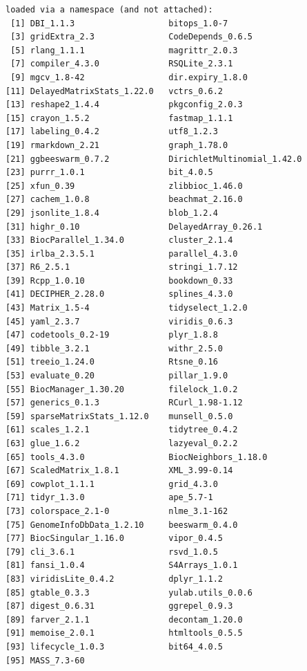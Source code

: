 \documentclass[
]{book}
\begin{document}
\begin{verbatim}
loaded via a namespace (and not attached):
 [1] DBI_1.1.3                   bitops_1.0-7               
 [3] gridExtra_2.3               CodeDepends_0.6.5          
 [5] rlang_1.1.1                 magrittr_2.0.3             
 [7] compiler_4.3.0              RSQLite_2.3.1              
 [9] mgcv_1.8-42                 dir.expiry_1.8.0           
[11] DelayedMatrixStats_1.22.0   vctrs_0.6.2                
[13] reshape2_1.4.4              pkgconfig_2.0.3            
[15] crayon_1.5.2                fastmap_1.1.1              
[17] labeling_0.4.2              utf8_1.2.3                 
[19] rmarkdown_2.21              graph_1.78.0               
[21] ggbeeswarm_0.7.2            DirichletMultinomial_1.42.0
[23] purrr_1.0.1                 bit_4.0.5                  
[25] xfun_0.39                   zlibbioc_1.46.0            
[27] cachem_1.0.8                beachmat_2.16.0            
[29] jsonlite_1.8.4              blob_1.2.4                 
[31] highr_0.10                  DelayedArray_0.26.1        
[33] BiocParallel_1.34.0         cluster_2.1.4              
[35] irlba_2.3.5.1               parallel_4.3.0             
[37] R6_2.5.1                    stringi_1.7.12             
[39] Rcpp_1.0.10                 bookdown_0.33              
[41] DECIPHER_2.28.0             splines_4.3.0              
[43] Matrix_1.5-4                tidyselect_1.2.0           
[45] yaml_2.3.7                  viridis_0.6.3              
[47] codetools_0.2-19            plyr_1.8.8                 
[49] tibble_3.2.1                withr_2.5.0                
[51] treeio_1.24.0               Rtsne_0.16                 
[53] evaluate_0.20               pillar_1.9.0               
[55] BiocManager_1.30.20         filelock_1.0.2             
[57] generics_0.1.3              RCurl_1.98-1.12            
[59] sparseMatrixStats_1.12.0    munsell_0.5.0              
[61] scales_1.2.1                tidytree_0.4.2             
[63] glue_1.6.2                  lazyeval_0.2.2             
[65] tools_4.3.0                 BiocNeighbors_1.18.0       
[67] ScaledMatrix_1.8.1          XML_3.99-0.14              
[69] cowplot_1.1.1               grid_4.3.0                 
[71] tidyr_1.3.0                 ape_5.7-1                  
[73] colorspace_2.1-0            nlme_3.1-162               
[75] GenomeInfoDbData_1.2.10     beeswarm_0.4.0             
[77] BiocSingular_1.16.0         vipor_0.4.5                
[79] cli_3.6.1                   rsvd_1.0.5                 
[81] fansi_1.0.4                 S4Arrays_1.0.1             
[83] viridisLite_0.4.2           dplyr_1.1.2                
[85] gtable_0.3.3                yulab.utils_0.0.6          
[87] digest_0.6.31               ggrepel_0.9.3              
[89] farver_2.1.1                decontam_1.20.0            
[91] memoise_2.0.1               htmltools_0.5.5            
[93] lifecycle_1.0.3             bit64_4.0.5                
[95] MASS_7.3-60                
\end{verbatim}
\end{document}
